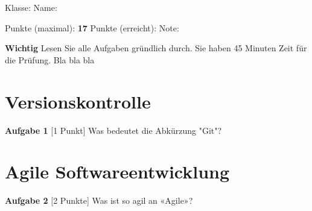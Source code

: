 \documentclass[a4paper,12pt]{scrartcl}
\begin{document}
\begin{large}
    Klasse: \underline{\hspace{6em}} \hspace{1em} Name: \underline{\hspace{17.5em}}

\vspace{14pt}

    Punkte (maximal): \textbf{17} \hspace{1em} Punkte (erreicht): \underline{\hspace{4em}} \hspace{1em} Note: \underline{\hspace{5em}}
\end{large}

\vspace{14pt}
\dotfill
\vspace{14pt}

\textbf{Wichtig} Lesen Sie alle Aufgaben gründlich durch. Sie haben 45 Minuten Zeit für die Prüfung. Bla bla bla

\section{Versionskontrolle}

\textbf{Aufgabe 1} [1 Punkt] Was bedeutet die Abkürzung "Git"?

\begin{huge}
    \hrulefill

    \hrulefill

    \hrulefill

\end{huge}

\section{Agile Softwareentwicklung}

\textbf{Aufgabe 2} [2 Punkte] Was ist so agil an «Agile»?

\begin{huge}
    \hrulefill

    \hrulefill

    \hrulefill

\end{huge}
\end{document}
